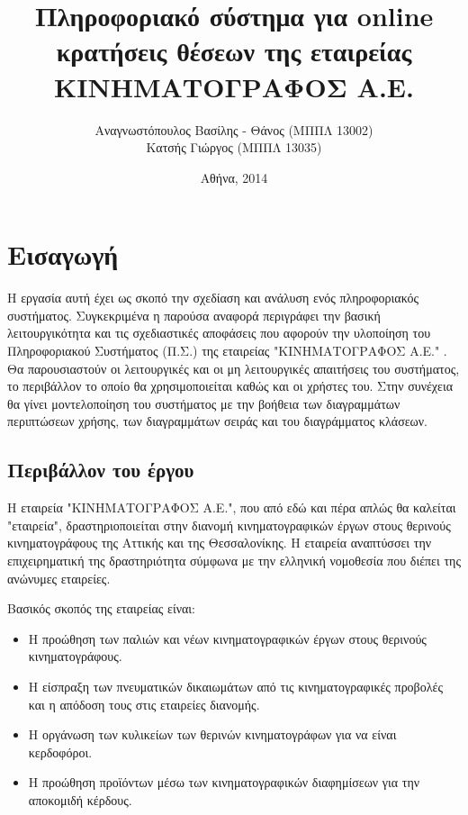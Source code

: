 \documentclass{assignment}
\title{Πληροφοριακό σύστημα για online κρατήσεις θέσεων της εταιρείας ΚΙΝΗΜΑΤΟΓΡΑΦΟΣ Α.Ε.}
\date{Αθήνα, 2014}
\author{Αναγνωστόπουλος Βασίλης - Θάνος (ΜΠΠΛ 13002) \\ Κατσής Γιώργος (ΜΠΠΛ 13035)}
\begin{document}
\maketitle

\setcounter{page}{1} 

\pagestyle{plain}
\tableofcontents
\listoffigures
\newpage

\setcounter{page}{1} 

\section{Εισαγωγή}

Η εργασία αυτή έχει ως σκοπό την σχεδίαση και ανάλυση ενός πληροφοριακός συστήματος. Συγκεκριμένα η παρούσα αναφορά περιγράφει την βασική λειτουργικότητα και τις σχεδιαστικές αποφάσεις που αφορούν την υλοποίηση του Πληροφοριακού Συστήματος (Π.Σ.) της εταιρείας "ΚΙΝΗΜΑΤΟΓΡΑΦΟΣ Α.Ε." . Θα παρουσιαστούν οι λειτουργικές και οι μη λειτουργικές απαιτήσεις του συστήματος, το περιβάλλον το οποίο θα χρησιμοποιείται καθώς και οι χρήστες του. Στην συνέχεια θα γίνει μοντελοποίηση του συστήματος με την βοήθεια των διαγραμμάτων περιπτώσεων χρήσης, των διαγραμμάτων σειράς και του διαγράμματος κλάσεων.

\subsection{Περιβάλλον του έργου}

Η εταιρεία "ΚΙΝΗΜΑΤΟΓΡΑΦΟΣ Α.Ε.", που από εδώ και πέρα απλώς θα καλείται "εταιρεία", δραστηριοποιείται στην διανομή κινηματογραφικών έργων στους θερινούς κινηματογράφους της Αττικής και της Θεσσαλονίκης. Η εταιρεία αναπτύσσει την επιχειρηματική της δραστηριότητα σύμφωνα με την ελληνική νομοθεσία που διέπει της ανώνυμες εταιρείες.

Βασικός σκοπός της εταιρείας είναι:

\begin{itemize}
\item Η προώθηση των παλιών και νέων κινηματογραφικών έργων στους θερινούς κινηματογράφους. 
\item Η είσπραξη των πνευματικών δικαιωμάτων από τις κινηματογραφικές προβολές και η απόδοση τους στις εταιρείες διανομής.
\item Η οργάνωση των κυλικείων των θερινών κινηματογράφων για να είναι κερδοφόροι.
\item Η προώθηση προϊόντων μέσω των κινηματογραφικών διαφημίσεων για την αποκομιδή κέρδους.
\end{itemize}
\end{document}
